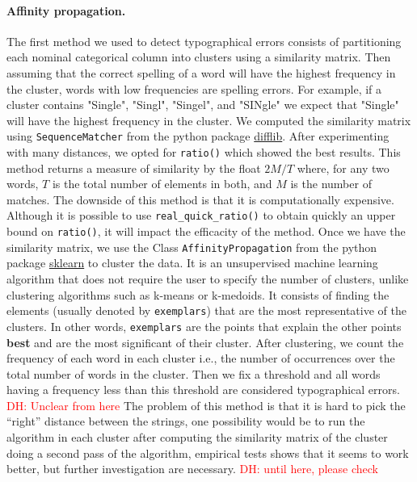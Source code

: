 \documentclass{article}
\newcommand\dhawat[1]{\textcolor{red}{DH: #1}}
\begin{document}
\paragraph{ Affinity propagation.}
\label{sub:Affinity propagation algorithm}
The first method we used to detect typographical errors consists of partitioning each nominal categorical column into clusters using a similarity matrix.
Then assuming that the correct spelling of a word will have the highest frequency in the cluster, words with low frequencies are spelling errors.
For example, if a cluster contains "Single", "Singl", "Singel", and "SINgle" we expect that "Single" will have the highest frequency in the cluster.
We computed the similarity matrix using \texttt{SequenceMatcher} from the python package \href{https://docs.python.org/3/library/difflib.html}{difflib}.
After experimenting with many distances, we opted for \texttt{ratio()} which showed the best results.
This method returns a measure of similarity by the float $2M /T$ where, for any two words, $T$ is the total number of elements in both, and $M$ is the number of matches.
The downside of this method is that it is computationally expensive.
Although it is possible to use \texttt{real\_quick\_ratio()} to obtain quickly an upper bound on \texttt{ratio()}, it will impact the efficacity of the method.
Once we have the similarity matrix, we use the Class \texttt{AffinityPropagation} from the python package \href{https://scikit-learn.org/stable/modules/generated/sklearn.cluster.AffinityPropagation.html#sklearn-cluster-affinitypropagation}{sklearn} to cluster the data.
It is an unsupervised machine learning algorithm that does not require the user to specify the number of clusters, unlike clustering algorithms such as k-means or k-medoids.
It consists of finding the elements (usually denoted by \texttt{exemplars}) that are the most representative of the clusters.
In other words, \texttt{exemplars} are the points that explain the other points \textbf{best} and are the most significant of their cluster.
After clustering, we count the frequency of each word in each cluster i.e., the number of occurrences over the total number of words in the cluster.
Then we fix a threshold and all words having a frequency less than this threshold are considered typographical errors.
\dhawat{Unclear from here}
The problem of this method is that it is hard to pick the ``right'' distance between the strings, one possibility would be to run the algorithm in each cluster after computing the similarity matrix of the cluster doing a second pass of the algorithm, empirical tests shows that it seems to work better, but further investigation are necessary.
\dhawat{until here, please check}
\end{document}
